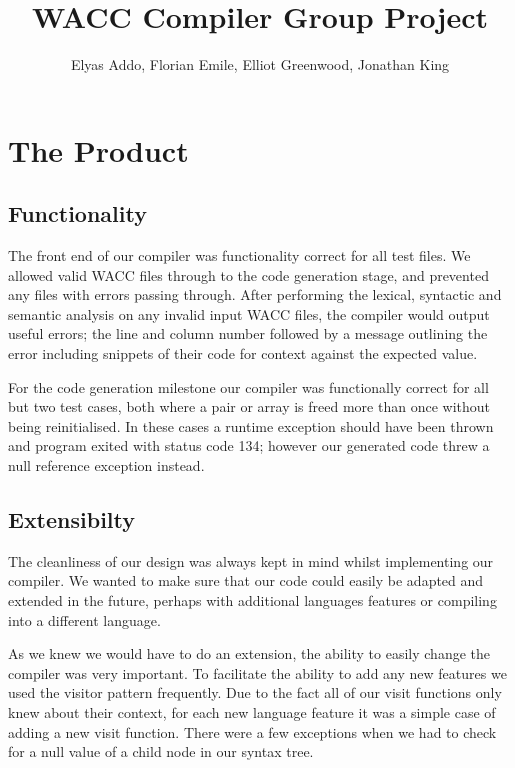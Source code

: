 \documentclass[11pt,a4paper]{article}
\begin{document}
\title{WACC Compiler Group Project}
\author{Elyas Addo, Florian Emile, Elliot Greenwood, Jonathan King}

\maketitle

\section{The Product}
\label{sec:The Product}

\subsection{Functionality}
\label{sub:Functionality}

The front end of our compiler was functionality correct for all test files. We allowed valid WACC files through to the code generation stage, and prevented any files with errors passing through. After performing the lexical, syntactic and semantic analysis on any invalid input WACC files, the compiler would output useful errors; the line and column number followed by a message outlining the error including snippets of their code for context against the expected value.

For the code generation milestone our compiler was functionally correct for all but two test cases, both where a pair or array is freed more than once without being reinitialised. In these cases a runtime exception should have been thrown and program exited with status code 134; however our generated code threw a null reference exception instead.

\subsection{Extensibilty}
\label{subs:Extensibilty}

The cleanliness of our design was always kept in mind whilst implementing our compiler. We wanted to make sure that our code could easily be adapted and extended in the future, perhaps with additional languages features or compiling into a different language.

As we knew we would have to do an extension, the ability to easily change the compiler was very important. To facilitate the ability to add any new features we used the visitor pattern frequently. Due to the fact all of our visit functions only knew about their context, for each new language feature it was a simple case of adding a new visit function. There were a few exceptions when we had to check for a null value of a child node in our syntax tree.
\end{document}
